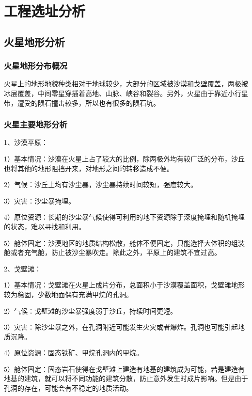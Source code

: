 \chapter{工程选址分析}
\label{chp:location:begin}
\section{火星地形分析}

\subsection{火星地形分布概况}

火星上的地形地貌种类相对于地球较少，大部分的区域被沙漠和戈壁覆盖，两极被冰层覆盖，中间零星穿插着高地、山脉、峡谷和裂谷。另外，火星由于靠近小行星带，遭受的陨石撞击较多，所以也有很多的陨石坑。

\subsection{火星主要地形分析}

1、沙漠平原：

1）基本情况：沙漠在火星上占了较大的比例，除两极外均有较广泛的分布，沙丘也将其他的地形阻挡开来，对地形之间的转移造成不便。

2）气候：沙丘上均有沙尘暴，沙尘暴持续时间较短，强度较大。

3）灾害：沙尘暴掩埋。

4）原位资源：长期的沙尘暴气候使得可利用的地下资源除于深度掩埋和随机掩埋的状态，难以寻找和利用。

5）舱体固定：沙漠地区的地质结构松散，舱体不便固定，只能选择大体积的组装舱或者充气舱，防止被沙尘暴吹走。除此之外，平原上的建筑不宜过高。

2、戈壁滩：

1）基本情况：戈壁滩在火星上成片分布，总面积小于沙漠覆盖面积，戈壁滩地形较为稳固，少数地面偶有充满甲烷的孔洞。

2）气候：戈壁滩的沙尘暴强度弱于沙丘，持续时间更短。

3）灾害：除沙尘暴之外，在孔洞附近可能发生火灾或者爆炸。孔洞也可能引起地质沉降。

4）原位资源：固态铁矿、甲烷孔洞内的甲烷。

5）舱体固定：固态岩石使得在戈壁滩上建造有地基的建筑成为可能，若是建造有地基的建筑，就可以将不同功能的建筑分散，防止意外发生时成片影响。但是由于孔洞的存在，可能会有不稳定的地质活动。

